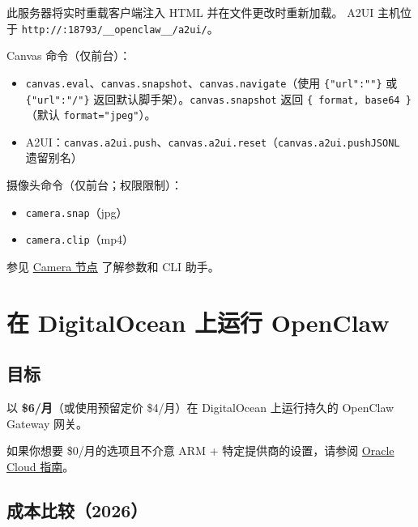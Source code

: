 此服务器将实时重载客户端注入 HTML 并在文件更改时重新加载。
A2UI 主机位于 \texttt{http://:18793/\_\_openclaw\_\_/a2ui/}。

Canvas 命令（仅前台）：

\begin{itemize}
  \item \texttt{canvas.eval}、\texttt{canvas.snapshot}、\texttt{canvas.navigate}（使用 \texttt{\{"url":""\}} 或 \texttt{\{"url":"/"\}} 返回默认脚手架）。\texttt{canvas.snapshot} 返回 \texttt{\{ format, base64 \}}（默认 \texttt{format="jpeg"}）。
  \item A2UI：\texttt{canvas.a2ui.push}、\texttt{canvas.a2ui.reset}（\texttt{canvas.a2ui.pushJSONL} 遗留别名）
\end{itemize}


摄像头命令（仅前台；权限限制）：

\begin{itemize}
  \item \texttt{camera.snap}（jpg）
  \item \texttt{camera.clip}（mp4）
\end{itemize}


参见 \href{/nodes/camera}{Camera 节点} 了解参数和 CLI 助手。


\clearpage

\section{在 DigitalOcean 上运行 OpenClaw}


\subsection{目标}


以 \textbf{\$6/月}（或使用预留定价 \$4/月）在 DigitalOcean 上运行持久的 OpenClaw Gateway 网关。

如果你想要 \$0/月的选项且不介意 ARM + 特定提供商的设置，请参阅 \href{/platforms/oracle}{Oracle Cloud 指南}。

\subsection{成本比较（2026）}



